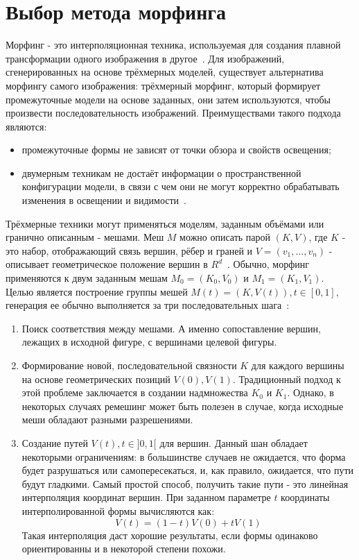 \section{Выбор метода морфинга}
\label{sec:morph}
Морфинг - это интерполяционная техника, используемая для создания плавной трансформации одного изображения в другое~\cite{volume_morph}. Для изображений, сгенерированных на основе трёхмерных моделей, существует альтернатива морфингу самого изображения: трёхмерный морфинг, который формирует промежуточные модели на основе заданных, они затем используются, чтобы произвести последовательность изображений. Преимуществами такого подхода являются:
\begin{itemize}
	\item промежуточные формы не зависят от точки обзора и свойств освещения;
	\item двумерным техникам не достаёт информации о пространственной конфигурации модели, в связи с чем они не могут корректно обрабатывать изменения в освещении и видимости~\cite{volume_morph}.
\end{itemize}
Трёхмерные техники могут применяться моделям, заданным объёмами или гранично описанным - мешами. Меш $M$ можно описать парой $(K, V)$, где $K$ - это набор, отображающий связь вершин, рёбер и граней и $V = (v_{1},\dots,v_{n})$ - описывает геометрическое положение вершин в $R^{d}$~\cite{alexa}. Обычно, морфинг применяются к двум заданным мешам $M_{0}=(K_{0},V_{0})$ и $M_{1}=(K_{1},V_{1})$. Целью является построение группы мешей $M(t)=(K,V(t)),t\in[0,1]$, генерация ее обычно выполняется за три последовательных шага~\cite{alexa}:
\begin{enumerate}
	\item Поиск соответствия между мешами. А именно сопоставление вершин, лежащих в исходной фигуре, с вершинами целевой фигуры.
	\item Формирование новой, последовательной связности $K$ для каждого вершины на основе геометрических позиций $V(0), V(1)$. Традиционный подход к этой проблеме заключается в создании надмножества $K_{0}$ и $K_{1}$. Однако, в некоторых случаях ремешинг может быть полезен в случае, когда исходные меши обладают разными разрешениями.
	\item Создание путей $V(t),t\in]0,1[$ для вершин. Данный шан обладает некоторыми ограничениям: в большинстве случаев не ожидается, что форма будет разрушаться или самопересекаться, и, как правило, ожидается, что пути будут гладкими. Самый простой способ, получить такие пути - это линейная интерполяция координат вершин. При заданном параметре $t$ координаты интерполированной формы вычисляются как:
	\begin{equation}
	V(t)=(1-t)V(0)+tV(1)
	\end{equation}
	Такая интерполяция даст хорошие результаты, если формы одинаково ориентированны и в некоторой степени похожи.
\end{enumerate}

